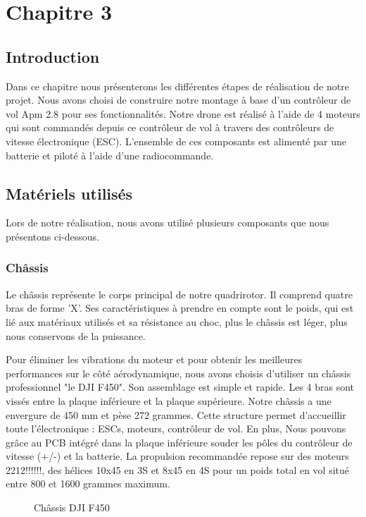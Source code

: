 

	

\chapter{Chapitre 3}
\newpage
	\section{Introduction}
	
	Dans ce chapitre nous présenterons les différentes étapes de réalisation de notre projet. Nous avons choisi de construire notre montage à base d’un contrôleur de vol Apm 2.8 pour ses fonctionnalités. Notre drone est réalisé à l’aide de 4 moteurs qui sont commandés depuis ce contrôleur de vol  à travers des contrôleurs de vitesse électronique (ESC). L'ensemble de ces composants  est alimenté par une batterie et piloté à l’aide d’une radiocommande.
	\section{Matériels utilisés}
	Lors de notre réalisation, nous avons utilisé plusieurs composants que nous présentons ci-dessous.
	\subsection{Châssis}
	Le châssis représente le corps principal de notre quadrirotor. Il comprend quatre bras de forme ’X’. Ses caractéristiques à prendre en compte sont le poids, qui est lié aux matériaux utilisés et sa résistance au choc, plus le châssis est léger, plus nous conservons de la puissance.
	
	Pour éliminer les vibrations du moteur et pour obtenir les meilleures performances sur le côté aérodynamique, nous avons choisis d’utiliser un châssis professionnel "le DJI F450". Son assemblage est simple et rapide. Les 4 bras sont vissés entre la plaque inférieure et la plaque supérieure. Notre châssis a une envergure de 450 mm et pèse 272 grammes.
	Cette structure permet d’accueillir toute l’électronique : ESCs, moteurs, contrôleur de vol. En plus, Nous pouvons grâce au PCB intégré dans la plaque inférieure souder les pôles  du contrôleur de vitesse (+/-) et la batterie. La propulsion recommandée repose sur des moteurs 2212!!!!!!, des hélices 10x45 en 3S et 8x45 en 4S pour un poids total en vol situé entre 800 et 1600 grammes maximum.
	
	\begin{figure} [h]
		\begin{center}
			\centering
		\end{center}
		\caption{Châssis DJI F450}
	\end{figure}
	\newpage
